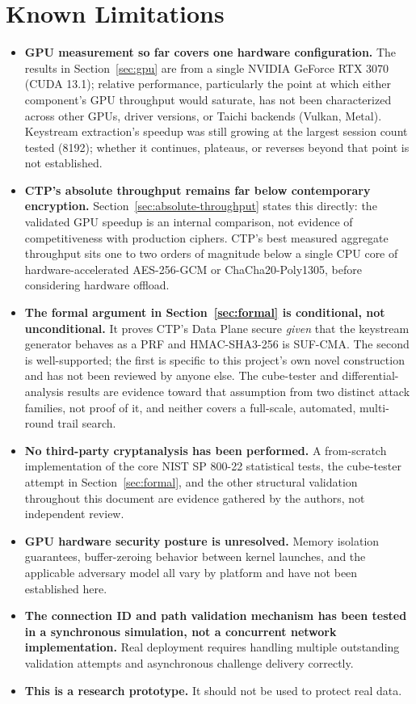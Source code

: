 \documentclass[twocolumn,10pt,journal,compsoc]{IEEEtran}
\begin{document}
\section{Known Limitations}
\label{sec:limitations}
\begin{itemize}
    \item \textbf{GPU measurement so far covers one hardware configuration.} The results in Section~\ref{sec:gpu} are from a single NVIDIA GeForce RTX 3070 (CUDA 13.1); relative performance, particularly the point at which either component's GPU throughput would saturate, has not been characterized across other GPUs, driver versions, or Taichi backends (Vulkan, Metal). Keystream extraction's speedup was still growing at the largest session count tested (8192); whether it continues, plateaus, or reverses beyond that point is not established.
    \item \textbf{CTP's absolute throughput remains far below contemporary encryption.} Section~\ref{sec:absolute-throughput} states this directly: the validated GPU speedup is an internal comparison, not evidence of competitiveness with production ciphers. CTP's best measured aggregate throughput sits one to two orders of magnitude below a single CPU core of hardware-accelerated AES-256-GCM or ChaCha20-Poly1305, before considering hardware offload.
    \item \textbf{The formal argument in Section~\ref{sec:formal} is conditional, not unconditional.} It proves CTP's Data Plane secure \emph{given} that the keystream generator behaves as a PRF and HMAC-SHA3-256 is SUF-CMA. The second is well-supported; the first is specific to this project's own novel construction and has not been reviewed by anyone else. The cube-tester and differential-analysis results are evidence toward that assumption from two distinct attack families, not proof of it, and neither covers a full-scale, automated, multi-round trail search.
    \item \textbf{No third-party cryptanalysis has been performed.} A from-scratch implementation of the core NIST SP 800-22 statistical tests, the cube-tester attempt in Section~\ref{sec:formal}, and the other structural validation throughout this document are evidence gathered by the authors, not independent review.
    \item \textbf{GPU hardware security posture is unresolved.} Memory isolation guarantees, buffer-zeroing behavior between kernel launches, and the applicable adversary model all vary by platform and have not been established here.
    \item \textbf{The connection ID and path validation mechanism has been tested in a synchronous simulation, not a concurrent network implementation.} Real deployment requires handling multiple outstanding validation attempts and asynchronous challenge delivery correctly.
    \item \textbf{This is a research prototype.} It should not be used to protect real data.
\end{itemize}
\end{document}
